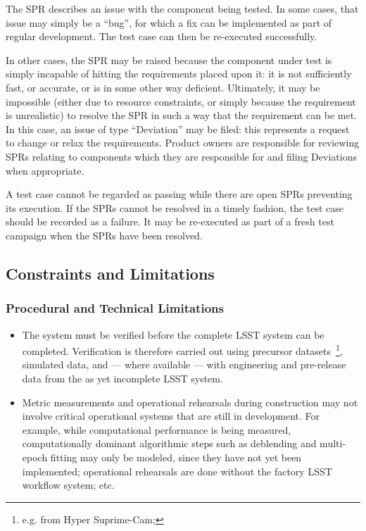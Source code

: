The SPR describes an issue with the component being tested.
In some cases, that issue may simply be a ``bug'', for which a fix can be implemented as part of regular \product{} development.
The test case can then be re-executed successfully.

In other cases, the SPR may be raised because the component under test is simply incapable of hitting the requirements placed upon it: it is not sufficiently fast, or accurate, or is in some other way deficient.
Ultimately, it may be impossible (either due to resource constraints, or simply because the requirement is unrealistic) to resolve the SPR in such a way that the requirement can be met.
In this case, an issue of type ``Deviation'' may be filed: this represents a request to change or relax the requirements.
Product owners are responsible for reviewing SPRs relating to components which they are responsible for and filing Deviations when appropriate.

A test case cannot be regarded as passing while there are open SPRs preventing its execution.
If the SPRs cannot be resolved in a timely fashion, the test case should be recorded as a failure.
It may be re-executed as part of a fresh test campaign when the SPRs have been resolved.

\subsection{Constraints and Limitations}

\subsubsection{Procedural and Technical Limitations}

\begin{itemize}


  \item{The \product{} system must be verified before the complete LSST system can be completed. Verification is therefore carried out using precursor datasets~\footnote{e.g. from Hyper Suprime-Cam; }, simulated data, and --- where available --- with engineering and pre-release data from the as yet incomplete LSST system.}

  \item{Metric measurements and operational rehearsals during construction may not involve critical operational systems that are still in development. For example, while computational performance is being measured, computationally dominant algorithmic steps such as deblending and multi-epoch fitting may only be modeled, since they have not yet been implemented; operational rehearsals are done without the factory LSST workflow system; etc.}

\end{itemize}

